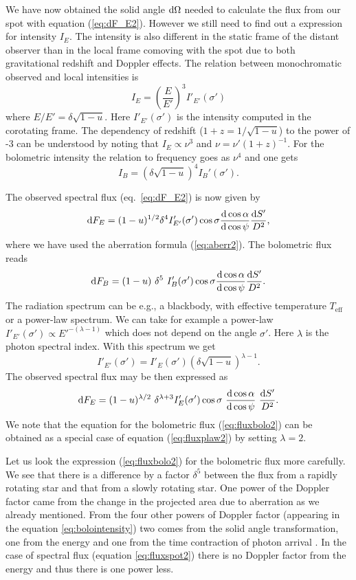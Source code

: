 \documentclass{wihuri}
\def\be{\begin{equation}}
\def\ee{\end{equation}}
\def\d{{\rm d}}
\def\Dop{\delta}
\begin{document}
We have now obtained the solid angle $\d\Omega$ needed to calculate the flux from our spot with equation (\ref{eq:dF_E2}). However we still need to find out a expression for intensity $I_{E}$. The intensity is also different in the static frame of the distant observer than in the local frame comoving with the spot due to both gravitational redshift and Doppler effects. The relation between monochromatic observed and local intensities is \cite{mtw}\cite{rybicki}%
\be
I_{E} = \left (\frac{E}{E'}\right )^3 I'_{E '} (\sigma')
\ee
where $E/E'=\Dop \sqrt{1-u}$. Here $I'_{E'}(\sigma')$ is the intensity computed in the corotating frame. The dependency of redshift ($1+z = 1/\sqrt{1-u}$) to the power of -3 can be understood by noting that $I_{E} \propto \nu^{3}$ and $\nu = \nu'(1+z)^{-1}$.
For the bolometric intensity the relation to frequency goes as $\nu^{4}$ and one gets
\be \label{eq:bolointensity}
I_{B}= \left (\Dop \sqrt{1-u} \right )^4 I_{B}'(\sigma') .
\ee

The observed spectral flux (eq.~\ref{eq:dF_E2}) is now given by
\be \label{eq:fluxspot2}
\d F_{E}=(1-u)^{1/2} \Dop^{4} I'_{E'}(\sigma') \cos\sigma
\frac{\d \cos\alpha}{\d\cos\psi}
 \frac{\d S'}{D^2} ,
\ee
where we have used the aberration formula (\ref{eq:aberr2}).
The bolometric flux reads
\be  \label{eq:fluxbolo2}
\d F_{B}= (1-u)\ \Dop^5 \
I_{B}'(\sigma')  \cos\sigma \frac{\d\cos\alpha}{\d\cos\psi} \frac{\d S'}{D^2} .
\ee
The radiation spectrum can be e.g., a blackbody, with effective temperature $T_{\mathrm{eff}}$ or a power-law spectrum. We can take for example a power-law $I'_{E'}(\sigma') \propto E '^{-(\lambda-1)}$ which does not depend on the angle $\sigma'$. Here $\lambda$ is the photon spectral index. With this spectrum we get
\be \label{eq:int_trans2}
I'_{E'}(\sigma') = I'_{E}(\sigma')
\left( \Dop \sqrt{1-u} \right)^{\lambda-1} .
\ee
The observed spectral flux %
may be then expressed as
\be\label{eq:fluxplaw2}
\d F_{E}= (1-u)^{\lambda/2}\ \Dop^{\lambda+3} I'_E(\sigma')
\cos\sigma\ \frac{\d\cos\alpha}{\d\cos\psi}\ \frac{\d S'}{D^2}.
\ee
We note that the equation for the bolometric flux (\ref{eq:fluxbolo2})
can be obtained as a special case of equation (\ref{eq:fluxplaw2}) by setting $\lambda=2$. 

Let us look the expression (\ref{eq:fluxbolo2}) for the bolometric flux more carefully. We see that there is a difference by a factor $\Dop^5$ between the flux from a rapidly rotating star and that from a slowly rotating star. One power of the Doppler factor came from the change in the projected area due to aberration as we already mentioned. From the four other powers of Doppler factor (appearing in the equation \ref{eq:bolointensity}) two comes from the solid angle transformation, one from the energy and one from the time contraction of photon arrival \cite{rybicki}. %
In the case of spectral flux (equation \ref{eq:fluxspot2}) there is no Doppler factor from the energy and thus there is one power less.
\end{document}

